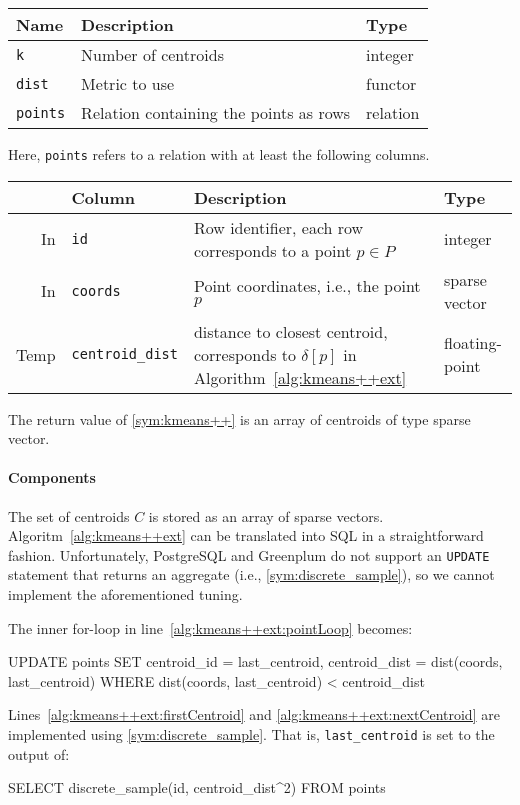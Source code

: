 \documentclass[letterpaper,11pt]{scrreprt}
\numberwithin{equation}{section}
\newcommand{\otoprule}{\midrule[\heavyrulewidth]}
\theoremstyle{algorithm}
\begin{document}
\begin{center}
	\begin{tabular}{lll}
		\toprule%
		\textbf{Name} & \textbf{Description} & \textbf{Type}
		\\\otoprule
		\texttt{k} &
		Number of centroids &
		integer
		\\\midrule
		\texttt{dist} &
		Metric to use &
		functor
		\\\midrule
		\texttt{points} &
		Relation containing the points as rows &
		relation
		\\\bottomrule
	\end{tabular}
\end{center}
%
Here, \texttt{points} refers to a relation with at least the following columns.
%
\begin{center}
	\begin{tabularx}{\linewidth}{rlXl}
		\toprule%
		& \textbf{Column} & \textbf{Description} & \textbf{Type}
		\\\otoprule
		In &
		\texttt{id} &
		Row identifier, each row corresponds to a point $p \in P$ &
		integer
		\\\midrule
		In &
		\texttt{coords} &
		Point coordinates, i.e., the point $p$ &
		sparse vector
		\\\midrule
		Temp &
		\texttt{centroid\_dist} &
		distance to closest centroid, corresponds to $\delta[p]$ in Algorithm~\ref{alg:kmeans++ext} &
		floating-point
		\\\bottomrule
	\end{tabularx}
\end{center}
%
The return value of \ref{sym:kmeans++} is an array of centroids of type sparse vector.

\paragraph{Components} The set of centroids $C$ is stored as an array of sparse vectors. Algoritm~\ref{alg:kmeans++ext} can be translated into SQL in a straightforward fashion. Unfortunately, PostgreSQL and Greenplum do not support an \texttt{UPDATE} statement that returns an aggregate (i.e., \ref{sym:discrete_sample}), so we cannot implement the aforementioned tuning.

The inner for-loop in line~\ref{alg:kmeans++ext:pointLoop} becomes:
\begin{sqlcode}
	UPDATE points
	SET centroid_id = last_centroid,
	    centroid_dist = dist(coords, last_centroid)
	WHERE
	    dist(coords, last_centroid) < centroid_dist
\end{sqlcode}
Lines~\ref{alg:kmeans++ext:firstCentroid} and \ref{alg:kmeans++ext:nextCentroid} are implemented using \ref{sym:discrete_sample}. That is, \texttt{last\_centroid} is set to the output of:
\begin{sqlcode}
	SELECT discrete_sample(id, centroid_dist^2) FROM points
\end{sqlcode}
\end{document}
